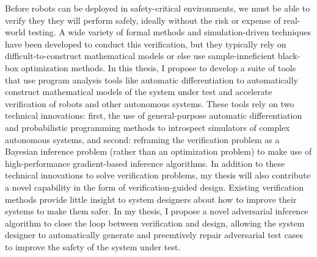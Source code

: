 %
%

Before robots can be deployed in safety-critical environments, we must be able to verify they they will perform safely, ideally without the risk or expense of real-world testing. A wide variety of formal methods and simulation-driven techniques have been developed to conduct this verification, but they typically rely on difficult-to-construct mathematical models or else use sample-inneficient black-box optimization methods. In this thesis, I propose to develop a suite of tools that use program analysis tools like automatic differentiation to automatically construct mathematical models of the system under test and accelerate verification of robots and other autonomous systems. These tools rely on two technical innovations: first, the use of general-purpose automatic differentiation and probabilistic programming methods to introspect simulators of complex autonomous systems, and second: reframing the verification problem as a Bayesian inference problem (rather than an optimization problem) to make use of high-performance gradient-based inference algorithms. In addition to these technical innovations to solve verification problems, my thesis will also contribute a novel capability in the form of verification-guided design. Existing verification methods provide little insight to system designers about how to improve their systems to make them safer. In my thesis, I propose a novel adversarial inference algorithm to close the loop between verification and design, allowing the system designer to automatically generate and preemtively repair adversarial test cases to improve the safety of the system under test.
